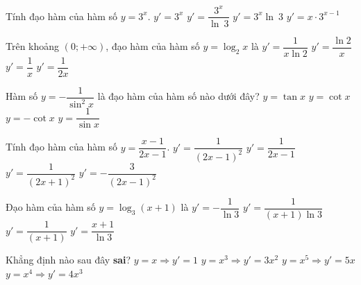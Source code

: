 \begin{ex}%
	 Tính đạo hàm của hàm số $y=3^{x}$.
	\choice 
		{$y'=3^{x}$} 
		 {$y'=\dfrac{3^{x}}{\ln~3}$}
		{\True $y'=3^{x}\ln~3$} 
		{$y'=x \cdot 3^{x-1}$} 
\end{ex}

\begin{ex}%
	Trên  khoảng $(0;+\infty)$, đạo hàm của hàm số $y=\log_2 x$ là
	 \choice
		{\True $y'=\dfrac{1}{x\ln  2}$}
		{$y'=\dfrac{\ln  2}{x}$}
		{$y'=\dfrac{1}{x}$} 
		{$y'=\dfrac{1}{2x}$} 
\end{ex}

\begin{ex}%
	Hàm số $y=-\dfrac{1}{\sin^2x}$ là đạo hàm của hàm số  nào dưới đây?
	 \choice
		{$y=\tan  x$}
		 {\True $y=\cot x$}
		{$y=-\cot  x$}
		 {$y=\dfrac{1}{\sin x}$}
\end{ex}

\begin{ex}%
	Tính đạo hàm  của hàm số $y=\dfrac{x-1}{2x-1}$.
	\choice 
		 {\True $y'=\dfrac{1}{(2x-1)^2} $}
		{$y'=\dfrac{1}{2x-1}  $}
		 {$y'=\dfrac{1}{(2x+1)^2} $}
		 {$y'=-\dfrac{3}{(2x-1)^2} $}
\end{ex}

\begin{ex}%
	Đạo  hàm của hàm số $y=\log_3\left(x+1\right)$ là
	\choice 
		{$y'=-\dfrac{1}{\ln 3}$} 
		 {\True $y'=\dfrac{1}{\left(x+1\right)\ln 3}$}
		 {$y'=\dfrac{1}{\left(x+1\right)}$}
		{$y'=\dfrac{x+1}{\ln 3}$} 
\end{ex}

\begin{ex}%
	Khẳng định nào sau đây  \textbf{sai}?
	\choice 
		{$y=x\Rightarrow  y'=1$}
		{$y=x^3  \Rightarrow y'=3x^2$}
		{\True  $y=x^5 \Rightarrow y'=5x$}
		{$y=x^4 \Rightarrow y'=4x^3$} 
\end{ex}

